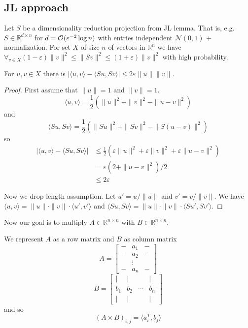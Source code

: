 \documentclass[11pt]{article}
\begin{document}
\subsection{JL approach \cite{10.1109/FOCS.2006.37}}

Let $S$ be a dimensionality reduction projection from JL lemma. That is, e.g. $S \in \mathbb{R}^{d \times n}$ for $d = \mathcal{O}(\varepsilon^{-2} \log n)$ with entries independent $\mathcal{N}(0,1)$ + normalization.
For set $X$ of size $n$ of vectors in $\mathbb{R}^n$ we have $\forall_{v \in X} (1-\varepsilon)\|v\|^2 \le \|S v\|^2 \le (1+\varepsilon) \|v\|^2$ with high probability.

\begin{lemma}
For $u,v \in X$ there is $|\langle u,v\rangle - \langle Su, Sv \rangle| \le 2\varepsilon \|u\| \|v\|$.
\end{lemma}
\begin{proof}
First assume that $\|u\|=1$ and $\|v\|=1$.
$$\langle u,v\rangle = \frac{1}{2}(\|u\|^2 + \|v\|^2 - \|u-v\|^2)$$
and
$$\langle Su,Sv\rangle = \frac{1}{2}(\|Su\|^2 + \|Sv\|^2 - \|S(u-v)\|^2)$$
so
\begin{align*}|\langle u,v\rangle - \langle Su, Sv \rangle| &\le \frac{1}{2}(\varepsilon \|u\|^2 + \varepsilon \|v\|^2 +  \varepsilon \|u-v\|^2)\\
&= \varepsilon(2+ \|u-v\|^2)/2\\
&\le 2\varepsilon
\end{align*}

Now we drop length assumption. Let $u' = u/\|u\|$ and $v' = v/\|v\|$. We have $\langle u,v \rangle = \|u\| \cdot \|v\| \cdot \langle u',v' \rangle$ and $\langle Su,Sv \rangle = \|u\| \cdot \|v\| \cdot \langle Su',Sv' \rangle$.

\end{proof}

Now our goal is to multiply $A \in \mathbb{R}^{n \times n}$ with $B \in \mathbb{R}^{n \times n}$.

We represent $A$ as a row matrix and $B$ as column matrix 
$$A = \begin{bmatrix} - & a_1 & -\\ - & a_2 & -\\ & \vdots & \\ - & a_n & - \end{bmatrix}$$
$$B = \begin{bmatrix} | & | & & | \\ b_1& b_2& \cdots& b_n\\ | & | & & |  \end{bmatrix}$$
and so
$$(A \times B)_{i,j} = \langle a_i^T, b_j \rangle$$
\end{document}
